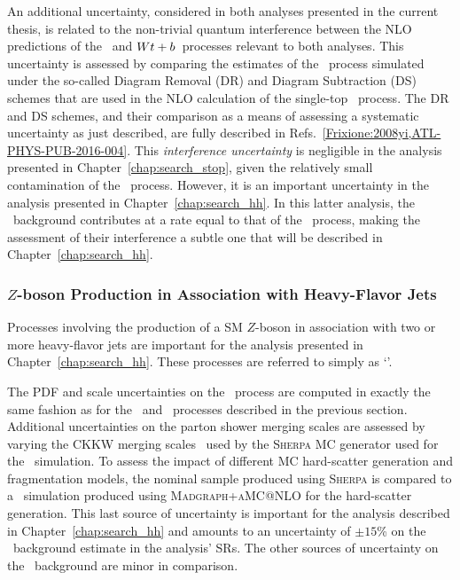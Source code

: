 An additional uncertainty, considered in both analyses presented in the current thesis, is related
to the non-trivial quantum interference between the NLO predictions of the \ttbar~and $Wt+b$~processes relevant
to both analyses.
This uncertainty is assessed by comparing the estimates of the \wt~process simulated
under the so-called Diagram Removal (DR) and Diagram Subtraction (DS) schemes that
are used in the NLO calculation of the single-top \wt~process.
The DR and DS schemes, and their comparison as a means of assessing a systematic uncertainty
as just described, are fully described in Refs.~\ref{Frixione:2008yi,ATL-PHYS-PUB-2016-004}.
This \textit{interference uncertainty} is negligible in the analysis presented in Chapter~\ref{chap:search_stop},
given the relatively small contamination of the \wt~process.
However, it is an important uncertainty in the analysis presented in Chapter~\ref{chap:search_hh}.
In this latter analysis, the \wt~background contributes at a rate equal to that of the \ttbar~process, making
the assessment of their interference a subtle one that will be described in Chapter~\ref{chap:search_hh}.

\subsubsection{$Z$-boson Production in Association with Heavy-Flavor Jets}

Processes involving the production of a SM $Z$-boson in association with
two or more heavy-flavor jets are important for the analysis presented in Chapter~\ref{chap:search_hh}.
These processes are referred to simply as `\zhf'.

The PDF and scale uncertainties on the \zhf~process are computed in exactly the
same fashion as for the \ttbar~and \wt~processes described in the previous section.
Additional uncertainties on the parton shower merging scales are assessed by varying
the CKKW merging scales~\cite{Lonnblad:2012ix} used by the \textsc{Sherpa} MC generator
used for the \zhf~simulation.
To assess the impact of different MC hard-scatter generation and fragmentation models, the 
nominal sample produced using \textsc{Sherpa} is compared to a \zhf~simulation produced using
\textsc{Madgraph+aMC@NLO} for the hard-scatter generation.
This last source of uncertainty is important for the analysis described in Chapter~\ref{chap:search_hh}
and amounts to an uncertainty of $\pm 15$\% on the \zhf~background estimate in the analysis' SRs.
The other sources of uncertainty on the \zhf~background are minor in comparison.

